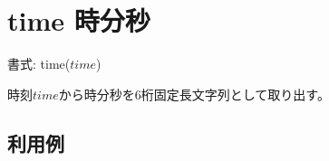
%

\section{time 時分秒\label{sect:time}}

書式: time($time$)

時刻$time$から時分秒を6桁固定長文字列として取り出す。

\subsection*{利用例}


%

